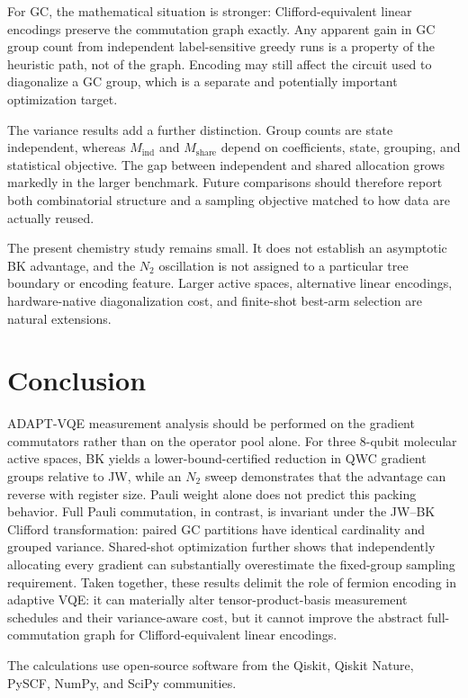 \documentclass[aps,pra,twocolumn,superscriptaddress,nofootinbib,floatfix]{revtex4-2}
\newcommand{\Mind}{M_{\mathrm{ind}}}
\newcommand{\Mshare}{M_{\mathrm{share}}}
\begin{document}
For GC, the mathematical situation is stronger: Clifford-equivalent linear encodings preserve the commutation graph exactly. Any apparent gain in GC group count from independent label-sensitive greedy runs is a property of the heuristic path, not of the graph. Encoding may still affect the circuit used to diagonalize a GC group, which is a separate and potentially important optimization target.

The variance results add a further distinction. Group counts are state independent, whereas $\Mind$ and $\Mshare$ depend on coefficients, state, grouping, and statistical objective. The gap between independent and shared allocation grows markedly in the larger benchmark. Future comparisons should therefore report both combinatorial structure and a sampling objective matched to how data are actually reused.

The present chemistry study remains small. It does not establish an asymptotic BK advantage, and the $N_2$ oscillation is not assigned to a particular tree boundary or encoding feature. Larger active spaces, alternative linear encodings, hardware-native diagonalization cost, and finite-shot best-arm selection are natural extensions.

\section{Conclusion}

ADAPT-VQE measurement analysis should be performed on the gradient commutators rather than on the operator pool alone. For three 8-qubit molecular active spaces, BK yields a lower-bound-certified reduction in QWC gradient groups relative to JW, while an $N_2$ sweep demonstrates that the advantage can reverse with register size. Pauli weight alone does not predict this packing behavior. Full Pauli commutation, in contrast, is invariant under the JW--BK Clifford transformation: paired GC partitions have identical cardinality and grouped variance. Shared-shot optimization further shows that independently allocating every gradient can substantially overestimate the fixed-group sampling requirement. Taken together, these results delimit the role of fermion encoding in adaptive VQE: it can materially alter tensor-product-basis measurement schedules and their variance-aware cost, but it cannot improve the abstract full-commutation graph for Clifford-equivalent linear encodings.

\begin{acknowledgments}
The calculations use open-source software from the Qiskit, Qiskit Nature, PySCF, NumPy, and SciPy communities.
\end{acknowledgments}

\balance


\end{document}
